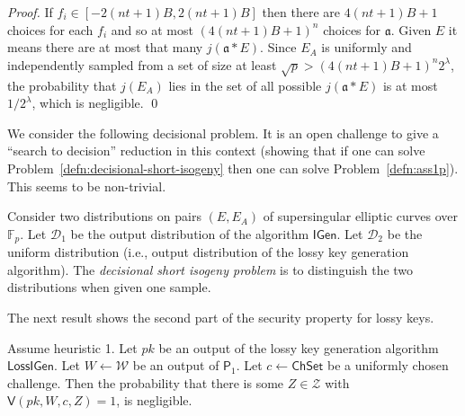 \documentclass{llncs}
\newcommand{\D}{\mathcal{D}}
\newcommand{\F}{\mathbb{F}}
\renewcommand{\a}{\mathfrak{a}}
\newcommand{\IGen}{\mathsf{IGen}}
\newcommand{\PP}{\mathsf{P}}
\newcommand{\VV}{\mathsf{V}}
\newcommand{\Wset}{\mathcal{W}}
\newcommand{\Zset}{\mathcal{Z}}
\newcommand{\ChSet}{\textsf{ChSet}}
\newcommand{\LossIGen}{\mathsf{LossIGen}}
\begin{document}
\begin{proof}
If $f_i \in [-2(nt+1)B,2(nt+1)B]$ then there are $4(nt+1)B + 1$ choices for each $f_i$ and so at most $(4 (nt+1)B + 1)^{n}$ choices for $\a$.
Given $E$ it means there are at most that many $j( \a * E )$. Since $E_A$ is uniformly and independently sampled from a set of size at least $\sqrt{p} > (4 (nt+1)B + 1)^{n} 2^\lambda$, the probability that $j(E_A)$ lies in the set of all possible $j( \a * E )$ is at most $1/2^\lambda$, which is negligible. \qed
\end{proof}


We consider the following decisional problem.
It is an open challenge to give a ``search to decision'' reduction in this context (showing that if one can solve Problem~\ref{defn:decisional-short-isogeny} then one can solve Problem~\ref{defn:ass1p}). This seems to be non-trivial.

\begin{problem} \label{defn:decisional-short-isogeny}
Consider two distributions on pairs $(E, E_A)$ of supersingular elliptic curves over $\F_p$.
Let $\D_1$ be the output distribution of the algorithm $\IGen$.
Let $\D_2$ be the uniform distribution (i.e., output distribution of the lossy key generation algorithm).
The \emph{decisional short isogeny problem} is to distinguish the two distributions when given one sample.
\end{problem}

The next result shows the second part of the security property for lossy keys.

\begin{lemma}
Assume heuristic 1.
Let $pk$ be an output of the lossy key generation algorithm $\LossIGen$.
Let $W \leftarrow \Wset$ be an output of $\PP_1$.
Let $c \leftarrow \ChSet$ be a uniformly chosen challenge.
Then the probability that there is some $Z \in \Zset$ with $\VV( pk, W, c, Z ) = 1$, is negligible.
\end{lemma}
\end{document}
